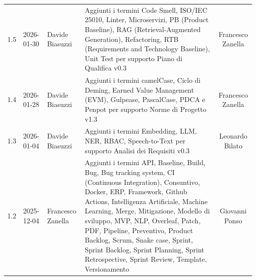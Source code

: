 \documentclass[a4paper, 11pt, oneside]{scrartcl} %
\begin{document}
\begin{center}
{\begin{tabular}{@{}llp{}p{}c@{}}
            1.5                                                                                                                                                            & 2026-01-30      & Davide Biasuzzi   & Aggiunti i termini Code Smell, ISO/IEC 25010, Linter, Microservizi, PB (Product Baseline), RAG (Retrieval-Augmented Generation), Refactoring, RTB (Requirements and Technology Baseline), Unit Test per supporto Piano di Qualifica v0.3                                                                                                                                                                                                 & Francesco Zanella     \\
            1.4                                                                                                                                                            & 2026-01-28      & Davide Biasuzzi   & Aggiunti i termini camelCase, Ciclo di Deming, Earned Value Management (EVM), Gulpease, PascalCase, PDCA e Penpot per supporto Norme di Progetto v1.3                                                                                                                                                                                                                                                                                    & Francesco Zanella     \\
            1.3                                                                                                                                                            & 2026-01-04      & Davide Biasuzzi   & Aggiunti i termini Embedding, LLM, NER, RBAC, Speech-to-Text per supporto Analisi dei Requisiti v0.3                                                                                                                                                                                                                                                                                                                                     & Leonardo Bilato       \\
            1.2                                                                                                                                                            & 2025-12-04      & Francesco Zanella & Aggiunti i termini API, Baseline, Build, Bug, Bug tracking system, CI (Continuous Integration), Consuntivo, Docker, ERP, Framework, Github Actions, Intelligenza Artificiale, Machine Learning, Merge, Mitigazione, Modello di sviluppo, MVP, NLP, Overleaf, Patch, PDF, Pipeline, Preventivo, Product Backlog, Scrum, Snake case, Sprint, Sprint Backlog, Sprint Planning, Sprint Retrospective, Sprint Review, Template, Versionamento & Giovanni Ponso        \\

\end{tabular}}
\end{center}
\end{document}
